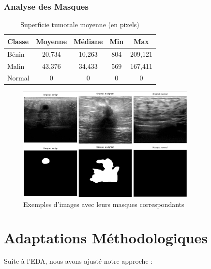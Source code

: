 \documentclass[a4paper,12pt]{article}
\begin{document}
\subsubsection{Analyse des Masques}
\begin{table}[h]
    \centering
    \caption{Superficie tumorale moyenne (en pixels)}
    \begin{tabular}{lcccc}
        \toprule
        Classe & Moyenne & Médiane & Min & Max \\
        \midrule
        Bénin & 20,734 & 10,263 & 804 & 209,121 \\
        Malin & 43,376 & 34,433 & 569 & 167,411 \\
        Normal & 0 & 0 & 0 & 0 \\
        \bottomrule
    \end{tabular}
    \label{tab:masks}
\end{table}

\linebreak

\begin{figure}[h]
    \centering
    \includegraphics[width=0.8\textwidth]{sample_images.png}
    \caption{Exemples d'images avec leurs masques correspondants}
    \label{fig:samples}
\end{figure}


\section{Adaptations Méthodologiques}
Suite à l'EDA, nous avons ajusté notre approche :
\end{document}
